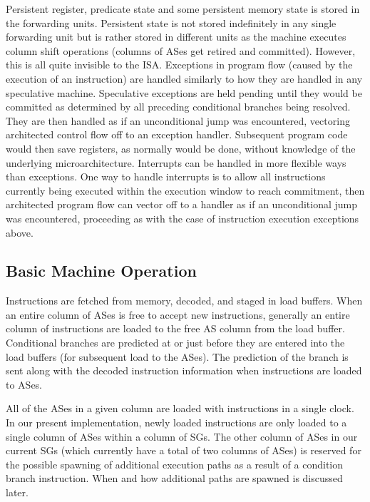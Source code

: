 \documentclass[10pt,dvips]{article}
\begin{document}
Persistent register, predicate state and some persistent
memory state is stored in the forwarding units.
Persistent state is not stored indefinitely in any single forwarding
unit but is rather stored in different units as the machine
executes column shift operations (columns of ASes get retired
and committed).  However, this is all quite invisible to the ISA.
Exceptions in program flow (caused by the execution
of an instruction) are handled similarly to how they
are handled in any speculative machine.  Speculative exceptions
are held pending until they would be committed as determined
by all preceding conditional branches being resolved.
They are then handled as if an unconditional jump was encountered,
vectoring architected control flow off to an exception handler.
Subsequent program code would then save registers, as normally
would be done, without
knowledge of the underlying microarchitecture.
Interrupts can be handled in more flexible ways than exceptions.
One way to handle interrupts is to allow all instructions
currently being executed within the execution window to reach
commitment, then architected program flow can vector off to
a handler as if an unconditional jump was encountered, proceeding
as with the case of instruction execution exceptions above.
%
%
\subsection{Basic Machine Operation}
%
Instructions are fetched from memory, decoded, and staged in 
load buffers.
When an entire column
of ASes is free to accept new instructions, generally
an entire column of instructions are loaded to the free AS
column from the load buffer.  
Conditional branches are
predicted at or just before they are entered into the load buffers
(for subsequent load to the ASes).
The prediction of the branch 
is sent along with the
decoded instruction information when instructions are 
loaded to ASes.

All of the ASes in a given column are loaded with 
instructions in a single clock.  
In our present implementation, newly loaded instructions
are only loaded to a single column of ASes within
a column of SGs.  The other column of ASes 
in our current SGs (which currently have a total
of two columns of ASes) is reserved for the possible spawning of 
additional execution paths as a result of a condition branch instruction.
When and how additional paths are spawned is discussed later.
\end{document}
